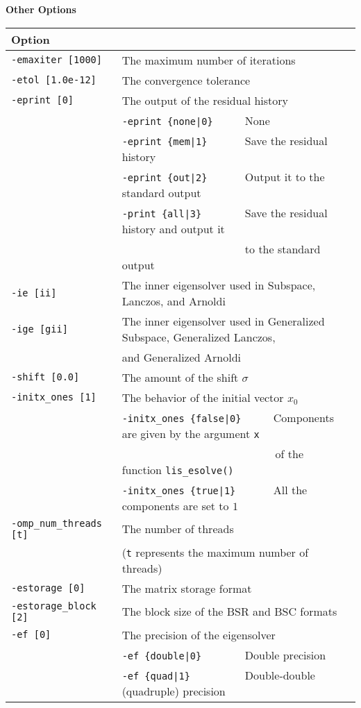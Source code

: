 \documentclass[a4paper]{article}
\begin{document}
\begin{minipage}[t]{\textwidth}
\begin{center}
{\bf Other Options}\\
\begin{tabular}{l|ll}\hline\hline
Option &                          \\ \hline
\verb=-emaxiter [1000]= & The maximum number of iterations         \\ 
\verb=-etol [1.0e-12]=  & The convergence tolerance                \\
\verb=-eprint [0]=      & The output of the residual history                \\
                       & \verb=-eprint {none|0}     =  None \\
                       & \verb=-eprint {mem|1}      =  Save the residual history\\
                       & \verb=-eprint {out|2}      =  Output it to the standard output\\
                       & \verb=-print {all|3}       =  Save the residual history and output it \\
                       & \verb=                     =  to the standard output \\
\verb=-ie [ii]= & The inner eigensolver used in Subspace, Lanczos, and Arnoldi\\
\verb=-ige [gii]= & The inner eigensolver used in Generalized Subspace, Generalized Lanczos, \\
                       & and Generalized Arnoldi\\
\verb=-shift [0.0]= & The amount of the shift $\sigma$ \\
\verb=-initx_ones [1]= & The behavior of the initial vector $x_{0}$  \\
                       & \verb=-initx_ones {false|0}     =  Components are given by the argument \verb=x= \\
                       & \verb=                           =  of the function \verb=lis_esolve()= \\
                       & \verb=-initx_ones {true|1}      =  All the components are set to $1$ \\
\verb=-omp_num_threads [t]= & The number of threads        \\ 
                            & (\verb=t= represents the maximum number of
 threads) \\
\verb=-estorage [0]=   & The matrix storage format \\
\verb=-estorage_block [2]=& The block size of the BSR and BSC formats\\ 
\verb=-ef [0]=         & The precision of the eigensolver\\
                       & \verb=-ef {double|0}       =  Double precision \\ 
                       & \verb=-ef {quad|1}         =  Double-double (quadruple) precision \\
\hline         
\end{tabular}
\end{center}
\end{minipage}
\end{document}
